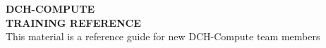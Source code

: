 \documentclass[11pt,flaqn]{book}
\begin{document}
\begingroup
\thispagestyle{empty}
\vspace*{1cm}
\par\normalfont\fontsize{30}{30}\sffamily\selectfont
\textbf{DCH-COMPUTE \\TRAINING REFERENCE}\\
{\LARGE This material is a reference guide for new DCH-Compute team members}\par
\endgroup

\newpage
\end{document}
